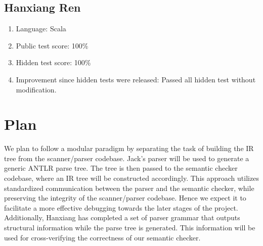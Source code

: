 \subsection*{Hanxiang Ren}
\begin{enumerate}
    \item Language: Scala
    \item Public test score: 100\%
    \item Hidden test score: 100\%
    \item Improvement since hidden tests were released: Passed all hidden test without modification.
\end{enumerate}

\section{Plan}

We plan to follow a modular paradigm by separating the task of building the IR tree from the scanner/parser codebase. Jack's parser will be used to generate a generic ANTLR parse tree. The tree is then passed to the semantic checker codebase, where an IR tree will be constructed accordingly. This approach utilizes standardized communication between the parser and the semantic checker, while preserving the integrity of the scanner/parser codebase. Hence we expect it to facilitate a more effective debugging towards the later stages of the project. Additionally, Hanxiang has completed a set of parser grammar that outputs structural information while the parse tree is generated. This information will be used for cross-verifying the correctness of our semantic checker.